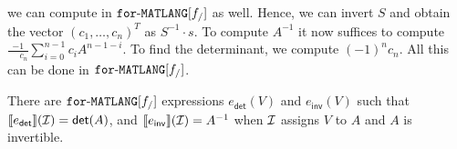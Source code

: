 we can compute in $\texttt{for}\text{-}\texttt{MATLANG}[f_/]$ as well. Hence, we can invert $S$ and obtain the vector $(c_1,\ldots,c_n)^T$ as $S^{-1}\cdot s$. To compute $A^{-1}$ it now suffices to compute
$\frac{-1}{\phantom{-1}c_n}\sum_{i=0}^{n-1}c_i A^{n-1-i}$. To find the determinant,
we compute $(-1)^nc_n$. All this can be done in $\texttt{for}\text{-}\texttt{MATLANG}[f_/]$.
\begin{proposition}\label{prop:inverse}
    There are $\texttt{for}\text{-}\texttt{MATLANG}[f_/]$ expressions $e_{\mathsf{det}}(V)$ and $e_{\mathsf{inv}}(V)$ such that
    $\llbracket e_{\mathsf{det}} \rrbracket(\mathcal{I})=\mathsf{det}(A)$, and  
    $\llbracket e_{\mathsf{inv}} \rrbracket(\mathcal{I})=A^{-1}$ when $\mathcal{I}$ assigns $V$
    to $A$ and $A$ is invertible.
\end{proposition}


